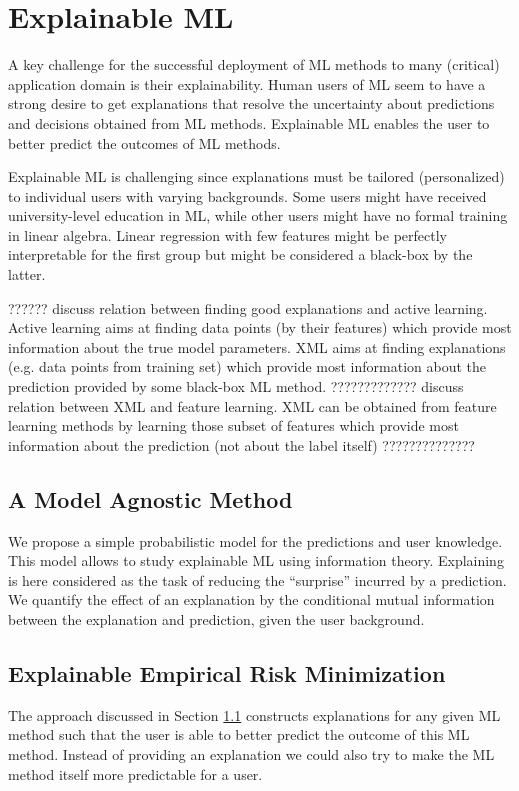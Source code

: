 \documentclass[12pt]{report}
\begin{document}
 
\chapter{Explainable ML}
\label{chap_explainable_ML}

A key challenge for the successful deployment of ML methods to 
many (critical) application domain is their explainability. Human users 
of ML seem to have a strong desire to get explanations that resolve 
the uncertainty about predictions and decisions obtained from ML 
methods. Explainable ML enables the user to better predict the 
outcomes of ML methods. 

Explainable ML is challenging since explanations must be tailored 
(personalized) to individual users with varying backgrounds. Some 
users might have received university-level education in ML, while 
other users might have no formal training in linear algebra. Linear 
regression with few features might be perfectly interpretable for 
the first group but might be considered a black-box by the latter. 


?????? 
discuss relation between finding good explanations and active 
learning. Active learning aims at finding data points (by their features) 
which provide most information about the true model parameters. 
XML aims at finding explanations (e.g. data points from training set) 
which provide most information about the prediction provided by 
some black-box ML method. 
?????????????
discuss relation between XML and feature learning. XML can be 
obtained from feature learning methods by learning those subset 
of features which provide most information about the prediction 
(not about the label itself)
?????????????? 


\section{A Model Agnostic Method}
\label{sec_model_agn_xml}

We propose a simple probabilistic model for the predictions and 
user knowledge. This model allows to study explainable ML using 
information theory. Explaining is here considered as the task of 
reducing the ``surprise'' incurred by a prediction. We quantify 
the effect of an explanation by the conditional mutual information 
between the explanation and prediction, given the user background. 

\section{Explainable Empirical Risk Minimization} 
The approach discussed in Section \ref{sec_model_agn_xml} constructs explanations 
for any given ML method such that the user is able to better predict 
the outcome of this ML method. Instead of providing an explanation 
we could also try to make the ML method itself more predictable for 
a user. 
\end{document}
